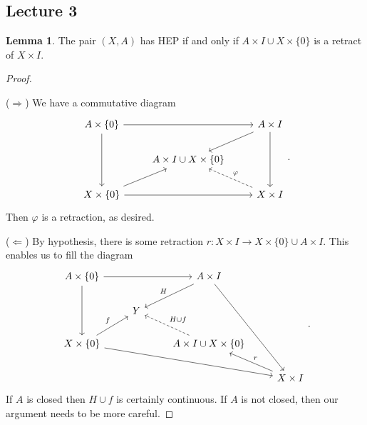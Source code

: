 \documentclass[10pt,letterpaper,cm]{nupset}
\theoremstyle{definition}
\theoremstyle{theorem}
\newtheorem{lemma}[definition]{Lemma}
\theoremstyle{remark}
\newcommand{\1}{\mathbb{1}}
\newcommand{\0}{\vec 0}
\begin{document}
\subsection{Lecture 3}

\begin{lemma}
The pair $(X, A)$ has HEP if and only if $A\times I \cup X \times \{0\}$ is a retract of $X\times I$.
\end{lemma}
\begin{proof} $ $

\smallskip

($\Longrightarrow$) We have a commutative diagram
\[
\begin{tikzcd}
A\times \{0\} \arrow[dd] \arrow[rr] &  & A\times I \arrow[ld] \arrow[dd] \\
 & A\times I \cup X \times \{0\} &  \\
X\times \{0\} \arrow[ru] \arrow[rr] &  & X\times I \arrow[lu, "\varphi"', dashed]
\end{tikzcd}
.\] Then $\varphi$ is a retraction, as desired. 

\medskip

($\Longleftarrow$) By hypothesis, there is some retraction $r: X\times I \to X\times \{0\} \cup A \times I$. This enables us to fill the diagram
\[
\begin{tikzcd}
A\times \{0\} \arrow[dd] \arrow[rr] &  & A\times I \arrow[ld, "H"'] \arrow[rddd] &  \\
 & Y &  &  \\
X\times \{0\} \arrow[ru, "f"] \arrow[rrrd] &  & A\times I \cup X \times \{0\} \arrow[lu, "H \cup f"', dashed] &  \\
 &  &  & X\times I \arrow[lu, "r"']
\end{tikzcd}
.\] If $A$ is closed then $H\cup f$ is certainly continuous. If $A$ is not closed, then our argument needs to be more careful. 
\end{proof}
\end{document}
